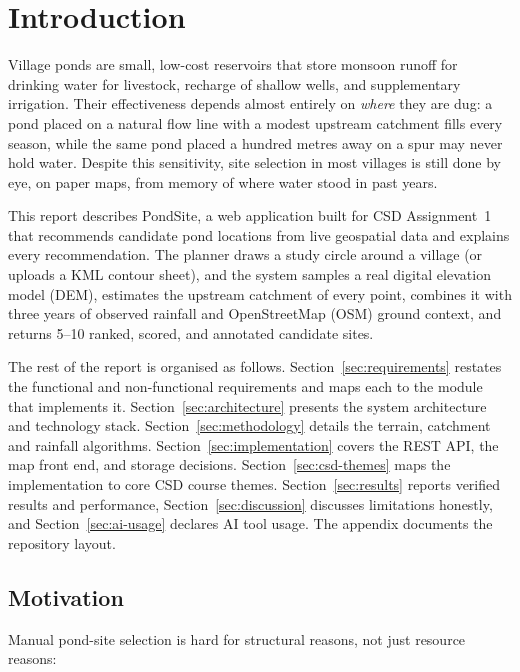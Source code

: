\documentclass[manuscript,screen,review]{acmart}
\begin{document}
\section{Introduction}
\label{sec:intro}
Village ponds are small, low-cost reservoirs that store monsoon runoff for
drinking water for livestock, recharge of shallow wells, and supplementary
irrigation. Their effectiveness depends almost entirely on \emph{where} they
are dug: a pond placed on a natural flow line with a modest upstream
catchment fills every season, while the same pond placed a hundred metres
away on a spur may never hold water. Despite this sensitivity, site selection
in most villages is still done by eye, on paper maps, from memory of where
water stood in past years.

This report describes PondSite, a web application built for CSD Assignment~1
that recommends candidate pond locations from live geospatial data and
explains every recommendation. The planner draws a study circle around a
village (or uploads a KML contour sheet), and the system samples a real
digital elevation model (DEM), estimates the upstream catchment of every
point, combines it with three years of observed rainfall and
OpenStreetMap (OSM) ground context, and returns 5--10 ranked, scored, and
annotated candidate sites.

The rest of the report is organised as follows.
Section~\ref{sec:requirements} restates the functional and non-functional
requirements and maps each to the module that implements it.
Section~\ref{sec:architecture} presents the system architecture and
technology stack. Section~\ref{sec:methodology} details the terrain,
catchment and rainfall algorithms. Section~\ref{sec:implementation} covers
the REST API, the map front end, and storage decisions.
Section~\ref{sec:csd-themes} maps the implementation to core CSD course
themes. Section~\ref{sec:results} reports verified results and performance,
Section~\ref{sec:discussion} discusses limitations honestly, and
Section~\ref{sec:ai-usage} declares AI tool usage. The appendix documents
the repository layout.

\subsection{Motivation}
Manual pond-site selection is hard for structural reasons, not just
resource reasons:
\end{document}
